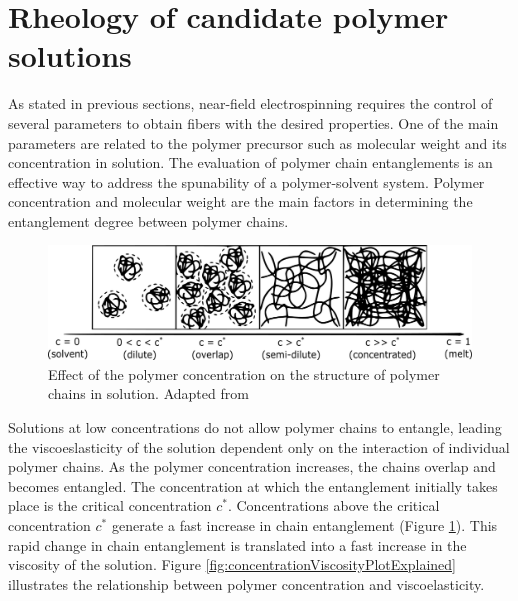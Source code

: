 \section{Rheology of candidate polymer solutions}
As stated in previous sections, near-field electrospinning requires the control of several parameters to obtain fibers with the desired properties. One of the main parameters are related to the polymer precursor such as molecular weight and its concentration in solution. The evaluation of polymer chain entanglements is an effective way to address the spunability of a polymer-solvent system. \cite{Shenoy2005} Polymer concentration and molecular weight are the main factors in determining the entanglement degree between polymer chains. 

\begin{figure}[!th]
\centering
\includegraphics[scale=0.50]{./Figures/criticalConcentrationEntanglement.png}
\decoRule
\caption[Polymer Chain Entanglement in Function of Polymer Concentration]{Effect of the polymer concentration on the structure of polymer chains in solution. Adapted from \cite{Burghelea2020}}
\label{fig:criticalConcentrationEntanglement}
\end{figure}

Solutions at low concentrations do not allow polymer chains to entangle, leading the viscoeslasticity of the solution dependent only on the interaction of individual polymer chains. As the polymer concentration increases, the chains overlap and becomes entangled. The concentration at which the entanglement initially takes place is the critical concentration $c^*$. Concentrations above the critical concentration $c^*$ generate a fast increase in chain entanglement (Figure \ref{fig:criticalConcentrationEntanglement}). This rapid change in chain entanglement is translated into a fast increase in the viscosity of the solution. Figure \ref{fig:concentrationViscosityPlotExplained} illustrates the relationship between polymer concentration and viscoelasticity. \cite{Burghelea2020, Gupta2005}


